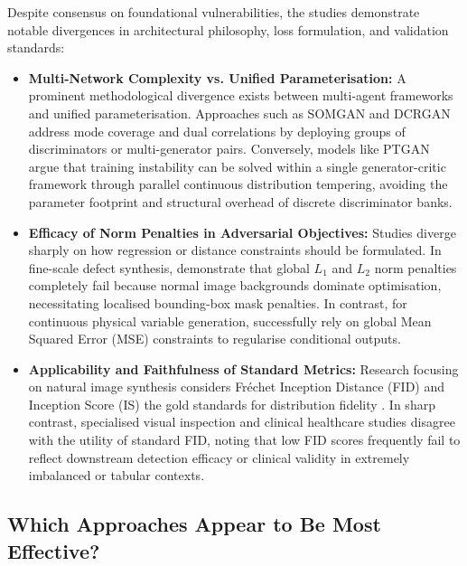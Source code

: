 \documentclass[12pt,a4paper]{article}
\begin{document}
Despite consensus on foundational vulnerabilities, the studies demonstrate notable divergences in architectural philosophy, loss formulation, and validation standards:

\begin{itemize}
    \item \textbf{Multi-Network Complexity vs. Unified Parameterisation:} A prominent methodological divergence exists between multi-agent frameworks and unified parameterisation. Approaches such as SOMGAN \parencite{li2024improving} and DCRGAN \parencite{zhu2025novel} address mode coverage and dual correlations by deploying groups of discriminators or multi-generator pairs. Conversely, models like PTGAN \parencite{sohn2026parallelly} argue that training instability can be solved within a single generator-critic framework through parallel continuous distribution tempering, avoiding the parameter footprint and structural overhead of discrete discriminator banks.
    
    \item \textbf{Efficacy of Norm Penalties in Adversarial Objectives:} Studies diverge sharply on how regression or distance constraints should be formulated. In fine-scale defect synthesis, \textcite{li2023eid} demonstrate that global $L_1$ and $L_2$ norm penalties completely fail because normal image backgrounds dominate optimisation, necessitating localised bounding-box mask penalties. In contrast, for continuous physical variable generation, \textcite{zhu2025novel} successfully rely on global Mean Squared Error (MSE) constraints to regularise conditional outputs.
    
    \item \textbf{Applicability and Faithfulness of Standard Metrics:} Research focusing on natural image synthesis considers Fr\'echet Inception Distance (FID) and Inception Score (IS) the gold standards for distribution fidelity \parencite{li2024improving,sohn2026parallelly}. In sharp contrast, specialised visual inspection \parencite{li2023eid} and clinical healthcare studies \parencite{bietsch2023electronic} disagree with the utility of standard FID, noting that low FID scores frequently fail to reflect downstream detection efficacy or clinical validity in extremely imbalanced or tabular contexts.
\end{itemize}


\subsection{Which Approaches Appear to Be Most Effective?}
\end{document}
